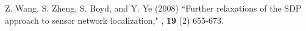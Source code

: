 \documentclass[12pt]{article}
\begin{document}
\begin{thebibliography}{99}
 Z. Wang, S. Zheng, S. Boyd, and Y. Ye (2008)
\newblock ``Further relaxations of the SDP approach to sensor network localization,"
, {\bf 19} (2) 655-673.



\end{thebibliography}
\end{document}

